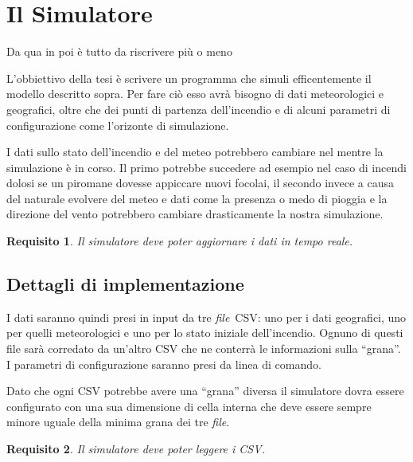 \documentclass[draft]{article}
\newcommand{\file}{\textit{file}}
\newtheorem{requirement}{Requisito}
\begin{document}

\section{Il Simulatore}

Da qua in poi è tutto da riscrivere più o meno

\noindent\hrulefill

L'obbiettivo della tesi è scrivere un programma che simuli efficentemente il
modello descritto sopra. Per fare ciò esso avrà bisogno di dati meteorologici e
geografici, oltre che dei punti di partenza dell'incendio e di alcuni parametri
di configurazione come l'orizonte di simulazione.

I dati sullo stato dell'incendio e del meteo potrebbero cambiare nel mentre la
simulazione è in corso. Il primo potrebbe succedere ad esempio nel caso di
incendi dolosi se un piromane dovesse appiccare nuovi focolai, il secondo
invece a causa del naturale evolvere del meteo e dati come la presenza o medo di
pioggia e la direzione del vento potrebbero cambiare drasticamente la nostra
simulazione.

\begin{requirement}
Il simulatore deve poter aggiornare i dati in tempo reale.
\end{requirement}

\subsection{Dettagli di implementazione}

I dati saranno quindi presi in input da tre \file\ CSV: uno per i dati
geografici, uno per quelli meteorologici e uno per lo stato iniziale
dell'incendio.  Ognuno di questi file sarà corredato da un'altro CSV che ne
conterrà le informazioni sulla ``grana''. I parametri di configurazione saranno
presi da linea di comando.

Dato che ogni CSV potrebbe avere una ``grana'' diversa il simulatore dovra
essere configurato con una sua dimensione di cella interna che deve essere
sempre minore uguale della minima grana dei tre \file.

\begin{requirement}
Il simulatore deve poter leggere i CSV.
\end{requirement}
\end{document}
